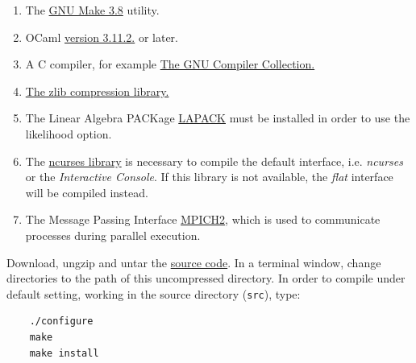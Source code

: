 \begin{enumerate}
    \item The \href{http://www.gnu.org/software/make/}{GNU Make 3.8} utility. 
    \item OCaml \href{http://www.ocaml.org}{version 3.11.2.} or later. 
    \item A C compiler, for example \href{http://gcc.gnu.org/} {The GNU Compiler Collection.}
    \item \href{http://www.zlib.net}{The zlib compression library.}
    \item The Linear Algebra PACKage \href {http://www.netlib.org/lapack/}{LAPACK} must be installed in order to 
    use the likelihood option.
    \item The \href{http://www.gnu.org/s/ncurses} {ncurses library} is necessary to compile the default interface, 
    i.e. \emph{ncurses} or the \emph{Interactive Console}. If this library is not available, the \emph{flat} interface will be 
    compiled instead.
   \item The Message Passing Interface \href{http://www-unix.mcs.anl.gov/mpi/}{MPICH2}, which is used to communicate 
   processes during parallel execution.
\end{enumerate}
Download, ungzip and untar the \href{http://research.amnh.org/scicomp/projects/poy.php}{\poy source code}.  
In a terminal window, change directories to the path of this uncompressed directory.  
In order to compile under default setting, working in the source directory (\texttt{src}), type:
\begin{verbatim}
	./configure
	make
	make install
\end{verbatim}

